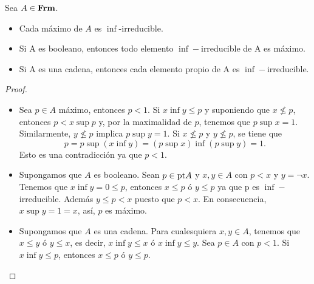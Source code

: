 \documentclass{comunicaciones}
\begin{document}
\begin{lem}
  Sea $A\in \mathbf{Frm}$.
  \begin{itemize}
      \item Cada máximo de $A$ es $\inf$-irreducible.
      \item Si A es booleano, entonces todo elemento $\inf-$irreducible de A es máximo.
      \item Si A es una cadena, entonces cada elemento propio de A es $\inf-$irreducible.
  \end{itemize}
\end{lem}
\begin{proof}\quad
  \begin{itemize}
      \item Sea $p\in A$ máximo, entonces $p<1$. Si $x\inf y\leq p$ y suponiendo que $x\not\leq p$, entonces $p<x\sup p$ y, por la maximalidad de $p$, tenemos que $p\sup x=1$. Similarmente, $y\not\leq p$ implica $p\sup y=1$. Si $x\not\leq p$ y $y\not\leq p$, se tiene que 
      \[p=p\sup (x\inf y)=(p\sup x)\inf(p\sup y)=1.\]
      Esto es una contradicción ya que $p<1$.
      \item Supongamos que $A$ es booleano. Sean $p\in\mathrm{pt} A$ y $x,y\in A$ con $p<x$ y $y=\neg x$. Tenemos que $x\inf y=0\leq p$, entonces $x\leq p$ ó $y\leq p$ ya que p es $\inf-$irreducible. Además $y\leq p<x$ puesto que $p<x$. En consecuencia, $x\sup y=1=x$, así, $p$ es máximo.
      \item Supongamos que $A$ es una cadena. Para cualesquiera $x,y\in A$, tenemos que $x\leq y$ ó $y\leq x$, es decir, $x\inf y\leq x$ ó $x\inf y\leq y$. Sea $p\in A$ con $p<1$. Si $x\inf y\leq p$, entonces $x\leq p$ ó $y\leq p$.
  \end{itemize}
\end{proof}
\end{document}

